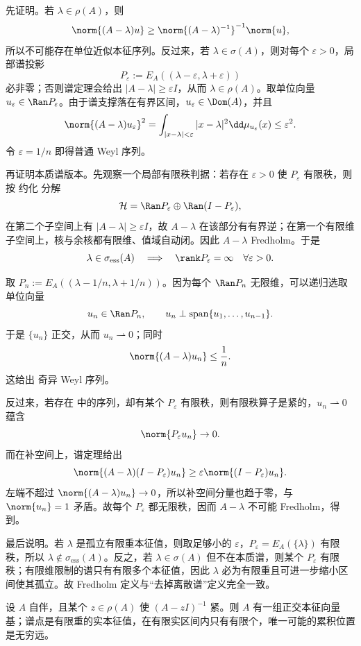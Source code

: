 先证明。若 $\lambda\in\rho(A)$，则
\[
 \norm{(A-\lambda)u}
 \ge\norm{(A-\lambda)^{-1}}^{-1}\norm{u},
\]
所以不可能存在单位近似本征序列。反过来，若 $\lambda\in\sigma(A)$，则对每个 $\varepsilon>0$，局部谱投影
\[
 P_\varepsilon:=E_A((\lambda-\varepsilon,\lambda+\varepsilon))
\]
必非零；否则谱定理会给出
$|A-\lambda|\ge\varepsilon I$，从而 $\lambda\in\rho(A)$。取单位向量
$u_\varepsilon\in\Ran P_\varepsilon$。由于谱支撑落在有界区间，$u_\varepsilon\in\Dom(A)$，并且
\[
 \norm{(A-\lambda)u_\varepsilon}^2
 =\int_{|x-\lambda|<\varepsilon}|x-\lambda|^2
 \dd\mu_{u_\varepsilon}(x)
 \le\varepsilon^2.
\]
令 $\varepsilon=1/n$ 即得普通 Weyl 序列。

再证明本质谱版本。先观察一个局部有限秩判据：若存在 $\varepsilon>0$ 使 $P_\varepsilon$ 有限秩，则按 约化 分解
\[
 \mathcal H=\Ran P_\varepsilon
 \oplus\Ran(I-P_\varepsilon),
\]
在第二个子空间上有
$|A-\lambda|\ge\varepsilon I$，故 $A-\lambda$ 在该部分有有界逆；在第一个有限维子空间上，核与余核都有限维、值域自动闭。因此 $A-\lambda$ Fredholm。于是
\[
 \lambda\in\sigma_{\mathrm{ess}}(A)
 \quad\Longrightarrow\quad
 \rank P_\varepsilon=\infty
 \quad\forall\varepsilon>0.
\]

取 $P_n:=E_A((\lambda-1/n,\lambda+1/n))$。因为每个 $\Ran P_n$ 无限维，可以递归选取单位向量
\[
 u_n\in\Ran P_n,
 \qquad
 u_n\perp\operatorname{span}\{u_1,\ldots,u_{n-1}\}.
\]
于是 $\{u_n\}$ 正交，从而 $u_n\rightharpoonup0$；同时
\[
 \norm{(A-\lambda)u_n}\le\frac1n.
\]
这给出 奇异 Weyl 序列。

反过来，若存在 中的序列，却有某个
$P_\varepsilon$ 有限秩，则有限秩算子是紧的，$u_n\rightharpoonup0$ 蕴含
\[
 \norm{P_\varepsilon u_n}\to0.
\]
而在补空间上，谱定理给出
\[
 \norm{(A-\lambda)(I-P_\varepsilon)u_n}
 \ge\varepsilon\norm{(I-P_\varepsilon)u_n}.
\]
左端不超过 $\norm{(A-\lambda)u_n}\to0$，所以补空间分量也趋于零，与
$\norm{u_n}=1$ 矛盾。故每个 $P_\varepsilon$ 都无限秩，因而 $A-\lambda$ 不可能 Fredholm，得到。

最后说明。若 $\lambda$ 是孤立有限重本征值，则取足够小的 $\varepsilon$，$P_\varepsilon=E_A(\{\lambda\})$ 有限秩，所以 $\lambda\notin\sigma_{\mathrm{ess}}(A)$。反之，若 $\lambda\in\sigma(A)$ 但不在本质谱，则某个 $P_\varepsilon$ 有限秩；有限维限制的谱只有有限多个本征值，因此 $\lambda$ 必为有限重且可进一步缩小区间使其孤立。故 Fredholm 定义与“去掉离散谱”定义完全一致。

\begin{theorem}[紧预解式的谱结论]
设 \(A\) 自伴，且某个 \(z\in\rho(A)\) 使 \((A-zI)^{-1}\) 紧。则 \(A\) 有一组正交本征向量基；谱点是有限重的实本征值，在有限实区间内只有有限个，唯一可能的累积位置是无穷远。
\end{theorem}

